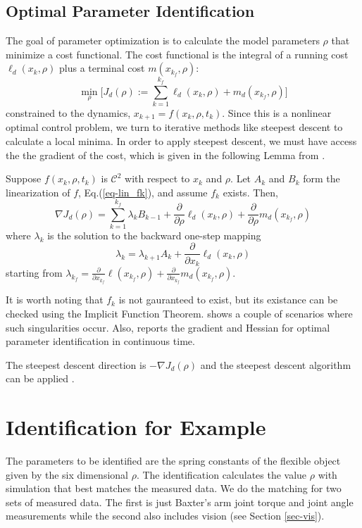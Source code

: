 \documentclass[runningheads,a4paper]{llncs}
\begin{document}
\subsection{Optimal Parameter Identification \label{sec-opt}}
The goal of parameter optimization is to calculate the model parameters $\rho$ that minimize a cost functional.  The cost functional is the integral of a running cost $\ell_d(x_k,\rho)$ plus a terminal cost $m(x_{k_f},\rho)$:
\[
\min_{\rho} \Big[J_d(\rho):=\sum_{k=1}^{k_f}\ell_d(x_k,\rho) + m_d(x_{k_f},\rho)\Big]
\]
constrained to the dynamics, $x_{k+1} = f(x_k,\rho,t_k)$. Since this is a nonlinear optimal control problem, we turn to iterative methods like steepest descent to calculate a local minima. In order to apply steepest descent, we must have access the the gradient of the cost, which is given in the following Lemma from \cite{caldwell_coleman_correll_iros}. 
\begin{lemma}
\label{lem-grad_a}
Suppose $f(x_k,\rho,t_k)$ is $\mathcal{C}^2$ with respect to $x_k$ and $\rho$.  Let $A_k$ and $B_k$ form the linearization of $f$, Eq.(\ref{eq-lin_fk}), and assume $f_k$ exists.  Then,
\begin{equation}
\nabla J_d(\rho) = \sum_{k = 1}^{k_f}\lambda_kB_{k-1} +\frac{\partial}{\partial \rho}\ell_d(x_k,\rho) + \frac{\partial}{\partial \rho}m_d(x_{k_f},\rho)
\label{eq-DJa}
\end{equation}
where $\lambda_k$ is the solution to the backward one-step mapping
\begin{equation}
\lambda_k = \lambda_{k+1}A_{k} + \frac{\partial}{\partial x_{k}}\ell_d(x_{k},\rho) 
\label{eq-lambda}
\end{equation}
starting from $\lambda_{k_f} = \frac{\partial}{\partial x_{k_f}}\ell(x_{k_f},\rho) + \frac{\partial}{\partial x_{k_f}}m_d(x_{k_f},\rho)$.  
\end{lemma}

It is worth noting that $f_k$ is not gauranteed to exist, but its existance can be checked using the Implicit Function Theorem. \cite{johnson_schultz_murphey} shows a couple of scenarios where such singularities occur.  Also, \cite{miller_murphey} reports the gradient and Hessian for optimal parameter identification in continuous time.

The steepest descent direction is $-\nabla J_d(\rho)$ and the steepest descent algorithm can be applied \cite{kelley}.

\section{Identification for Example}
\label{sec-id_eg}
The parameters to be identified are the spring constants of the flexible object given by the six dimensional $\rho$.  The identification calculates the value $\rho$ with simulation that best matches the measured data. We do the matching for two sets of measured data.  The first is just Baxter's arm joint torque and joint angle measurements while the second also includes vision (see Section \ref{sec-vis}).  
\end{document}
